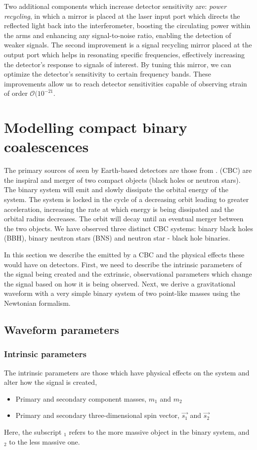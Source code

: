 Two additional components which increase detector sensitivity are: \textit{power recycling}, in which a mirror is placed at the laser input port which directs the reflected light back into the interferometer, boosting the circulating power within the arms and enhancing any signal-to-noise ratio, enabling the detection of weaker \gwadj signals. The second improvement is a signal recycling mirror placed at the output port which helps in resonating specific \gwadj frequencies, effectively increasing the detector's response to signals of interest. By tuning this mirror, we can optimize the detector's sensitivity to certain frequency bands. These improvements allow us to reach detector sensitivities capable of observing strain of order $\mathcal{O(10^{-21}}$. 

\section{\label{1:sec:modelling_CBC}Modelling compact binary coalescences}

The primary sources of \gws seen by Earth-based \gwadj detectors are those from \cbcs. \Cbcs (CBC) are the inspiral and merger of two compact objects (black holes or neutron stars). The binary system will emit \gws and slowly dissipate the orbital energy of the system. The system is locked in the cycle of a decreasing orbit leading to greater acceleration, increasing the rate at which energy is being dissipated and the orbital radius decreases. The orbit will decay until an eventual merger between the two objects. We have observed three distinct CBC systems: binary black holes (BBH), binary neutron stars (BNS) and neutron star - black hole binaries. 

In this section we describe the \gws emitted by a CBC and the physical effects these would have on \gwadj detectors. First, we need to describe the intrinsic parameters of the \gwadj signal being created and the extrinsic, observational parameters which change the signal based on how it is being observed. Next, we derive a gravitational waveform with a very simple binary system of two point-like masses using the Newtonian formalism.

\subsection{\label{1:sec:CBC-parameters}Waveform parameters}

\subsubsection{Intrinsic parameters}
The intrinsic parameters are those which have physical effects on the system and alter how the \gwadj signal is created,
\begin{itemize}
   \item Primary and secondary component masses, $m_{1}$ and $m_{2}$
   \item Primary and secondary three-dimensional spin vector, $\vec{s_{1}}$ and $\vec{s_{2}}$
\end{itemize}
Here, the subscript $_1$ refers to the more massive object in the binary system, and $_2$ to the less massive one.

